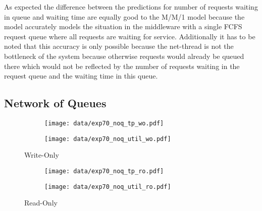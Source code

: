 \documentclass[report.tex]{subfiles}
\begin{document}
As expected the difference between the predictions for number of requests waiting in queue and waiting time are equally good to the M/M/1 model because the model accurately models the situation in the middleware with a single FCFS request queue where all requests are waiting for service. Additionally it has to be noted that this accuracy is only possible because the net-thread is not the bottleneck of the system because otherwise requests would already be queued there which would not be reflected by the number of requests waiting in the request queue and the waiting time in this queue.


\subsection{Network of Queues}


\begin{figure}
	\begin{subfigure}[b]{.49\linewidth}
		\centering
		\texttt{[image: data/exp70\_noq\_tp\_wo.pdf]}
	\end{subfigure}\hfill
	\begin{subfigure}[b]{.49\linewidth}
		\centering
		\texttt{[image: data/exp70\_noq\_util\_wo.pdf]}
	\end{subfigure}%
	\caption{Write-Only}\label{exp70_noq_wo}
\end{figure}

\begin{figure}
	\begin{subfigure}[b]{.49\linewidth}
		\centering
		\texttt{[image: data/exp70\_noq\_tp\_ro.pdf]}
	\end{subfigure}\hfill
	\begin{subfigure}[b]{.49\linewidth}
		\centering
		\texttt{[image: data/exp70\_noq\_util\_ro.pdf]}
	\end{subfigure}%
	\caption{Read-Only}\label{exp70_noq_ro}
\end{figure}
\end{document}
